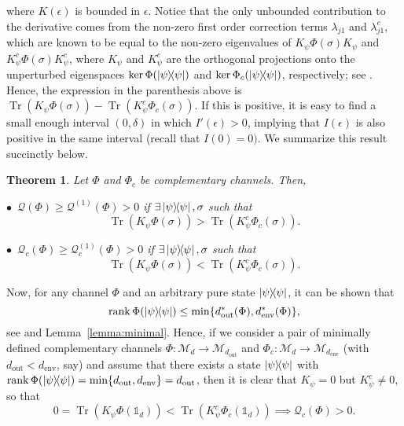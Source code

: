 \documentclass[a4paper,onecolumn,10pt,accepted=2022-07-11]{quantumarticle}
\newcommand{\M}[1]{\mathcal{M}_{#1}}
\newcommand{\env}{\operatorname{env}}
\newcommand{\out}{\operatorname{out}}
\newtheorem{theorem}{Theorem}[section]
\theoremstyle{definition}
\newcommand{\iden}{\mathbb{1}}
\begin{document}
where $K(\epsilon)$ is bounded in $\epsilon$. Notice that the only unbounded contribution to the derivative comes from the non-zero first order correction terms $\lambda_{j1}$ and $\lambda^c_{j1}$, which are known to be equal to the non-zero eigenvalues of $K_\psi\Phi(\sigma)K_\psi$ and $K^c_\psi\Phi(\sigma)K^c_\psi$, where $K_\psi$ and $K^c_\psi$ are the orthogonal projections onto the unperturbed eigenspaces $\ker\Phi(\ketbra{\psi}{\psi})$ and $\ker\Phi_c(\ketbra{\psi}{\psi})$, respectively; see \cite[Section 3.7]{baum1985perturbation}. Hence, the expression in the parenthesis above is $\operatorname{Tr}(K_\psi \Phi(\sigma)) - \operatorname{Tr}(K^c_\psi \Phi_c(\sigma))$. If this is positive, it is easy to find a small enough interval $(0,\delta)$ in which $I'(\epsilon)>0$, implying that $I(\epsilon)$ is also positive in the same interval (recall that $I(0)=0)$. We summarize this result succinctly below.

\begin{theorem}\cite[Theorem II.7]{Singh2022detecting}
Let $\Phi$ and $\Phi_c$ be complementary channels. Then,
\vspace{0.2cm}

$\bullet \,$ $\mathcal{Q}(\Phi)\geq\mathcal{Q}^{(1)}(\Phi)>0$ if $\exists \ketbra{\psi}{\psi},\sigma$ such that $$\operatorname{Tr}(K_\psi \Phi(\sigma))>\operatorname{Tr}(K^c_\psi \Phi_c(\sigma)).$$

$\bullet \,$ $\mathcal{Q}_c(\Phi)\geq\mathcal{Q}^{(1)}_c(\Phi)>0$ if $\exists\ketbra{\psi}{\psi},\sigma$ such that $$\operatorname{Tr}(K_\psi \Phi(\sigma))<\operatorname{Tr}(K^c_\psi \Phi_c(\sigma)).$$
\end{theorem}

Now, for any channel $\Phi$ and an arbitrary pure state $\ketbra{\psi}$, it can be shown that
    \begin{equation}
        \operatorname{rank}\Phi(\ketbra{\psi})\leq \min\{d^*_{\out}(\Phi),d^*_{\env}(\Phi)\},
    \end{equation}
see \cite[Theorem 3]{King2007complement} and Lemma~\ref{lemma:minimal}.
Hence, if we consider a pair of minimally defined complementary channels $\Phi:\M{d}\to \M{d_{\out}}$ and $\Phi_c:\M{d}\to\M{d_{\env}}$ (with $d_{\out}<d_{\env}$, say) and assume that there exists a state $\ketbra{\psi}$ with $\operatorname{rank}\Phi(\ketbra{\psi})= \min\{d_{\out},d_{\env}\}=d_{\out}$, then it is clear that $K_\psi=0$ but $K^c_\psi\neq 0$, so that 
\begin{equation*}
        0=\operatorname{Tr}(K_\psi \Phi(\iden_d))<\operatorname{Tr}(K^c_\psi \Phi_c(\iden_d)) \implies \mathcal{Q}_c(\Phi)>0.
    \end{equation*}
\end{document}
